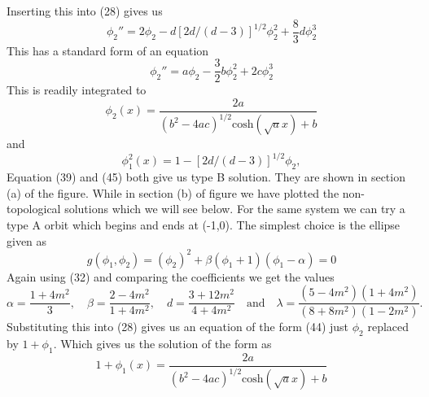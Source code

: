 \documentclass[a4paper, 12pt]{article}
\begin{document}
  Inserting this into (28) gives us 
   \begin{equation}%
\phi_2'' = 2\phi_2 - d[2d/(d-3)]^{1/2}\phi_2^2+ \frac{8}{3}d\phi_2^3 
 \end{equation} 
 This has a standard form of an equation
    \begin{equation}%
\phi_2'' = a\phi_2 - \frac{3}{2}b\phi_2^2+ 2c\phi_2^3 
 \end{equation} 
 This is readily integrated to 
    \begin{equation}%
\phi_2(x) = \frac{2a}{(b^2 - 4ac)^{1/2}\textrm{cosh}(\sqrt{a}x)+ b}
 \end{equation} 
 and
 \begin{equation}%
\phi_1^2(x) = 1 - [2d/(d-3)]^{1/2} \phi_2,
 \end{equation} 
 Equation (39) and (45) both give us type B solution. They are shown in section (a) of the figure. While in section (b) of figure we have plotted the non-topological solutions which we will see below. For the same system we can try a type A orbit which begins and ends at (-1,0). The simplest choice is the ellipse given as
  \begin{equation}%
g(\phi_1,\phi_2) = (\phi_2)^2 + \beta(\phi_1 + 1 )(\phi_1 - \alpha ) = 0
 \end{equation}
 Again using (32) and comparing the coefficients we get the values 
   \begin{equation}%
\alpha = \frac{1+4m^2}{3}, \quad \beta = \frac{2-4m^2}{1+4m^2}, \quad d=\frac{3+12m^2}{4+4m^2}\quad\textrm{and}\quad \lambda = \frac{(5-4m^2)(1+4m^2)}{(8+8m^2)(1-2m^2)}.
 \end{equation} 
 Substituting this into (28) gives us an equation of the form (44) just $\phi_2$ replaced by $1+\phi_1$. Which gives us the solution of the form as
     \begin{equation}%
1+\phi_1(x) = \frac{2a}{(b^2 - 4ac)^{1/2}\textrm{cosh}(\sqrt{a}x)+ b}
 \end{equation} 

 
 
\end{document}
